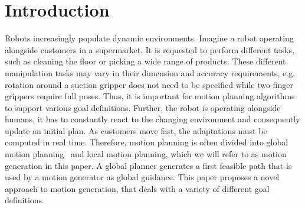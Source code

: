 \section{Introduction}%
\label{sec:tro21_intro}

Robots increasingly populate dynamic environments. 
Imagine a robot
operating alongside customers in a supermarket. It is requested to perform different
tasks, such as cleaning the floor or picking a wide range of products.
These different manipulation tasks may vary in their dimension
and accuracy requirements, e.g. rotation around a suction gripper
does not need to be specified while two-finger grippers require full poses. Thus,
it is important for motion planning algorithms to support various goal definitions.
Further, the robot is operating alongside humans, it has to constantly react to
the changing environment and consequently update an initial plan.
As customers move fast, the adaptations must be
computed in real time.
Therefore, motion planning is often divided into global motion
planning~\cite{Karaman2011} and local motion planning, which we will refer
to as motion generation in this paper. A global planner
generates a first feasible path that is used by a motion generator as global guidance.
This paper proposes a novel approach to motion generation, that deals
with a variety of different goal definitions. 

